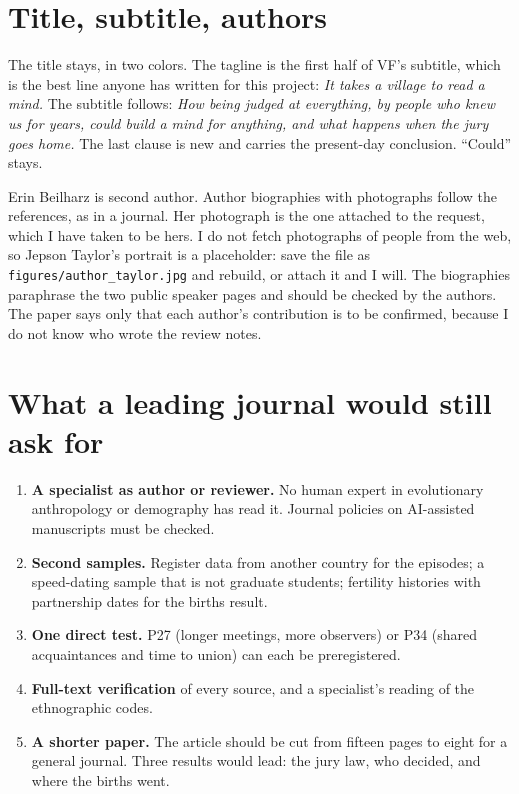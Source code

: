 \documentclass[10pt,letterpaper]{extarticle}
\newcommand{\lab}[1]{\textbf{#1}}
\begin{document}
\section{Title, subtitle, authors}

The title stays, in two colors. The tagline is the first half of VF's subtitle, which is the best line anyone has written
for this project: \emph{It takes a village to read a mind.} The subtitle follows: \emph{How being judged at everything, by
people who knew us for years, could build a mind for anything, and what happens when the jury goes home.} The last clause
is new and carries the present-day conclusion. ``Could'' stays.

Erin Beilharz is second author. Author biographies with photographs follow the references, as in a journal. Her
photograph is the one attached to the request, which I have taken to be hers. I do not fetch photographs of people from
the web, so Jepson Taylor's portrait is a placeholder: save the file as \texttt{figures/author\_taylor.jpg} and rebuild, or
attach it and I will. The biographies paraphrase the two public speaker pages and should be checked by the authors. The
paper says only that each author's contribution is to be confirmed, because I do not know who wrote the review notes.

\section{What a leading journal would still ask for}

\begin{enumerate}
\item \lab{A specialist as author or reviewer.} No human expert in evolutionary anthropology or demography has read it.
Journal policies on AI-assisted manuscripts must be checked.
\item \lab{Second samples.} Register data from another country for the episodes; a speed-dating sample that is not graduate
students; fertility histories with partnership dates for the births result.
\item \lab{One direct test.} P27 (longer meetings, more observers) or P34 (shared acquaintances and time to union) can each
be preregistered.
\item \lab{Full-text verification} of every source, and a specialist's reading of the ethnographic codes.
\item \lab{A shorter paper.} The article should be cut from fifteen pages to eight for a general journal. Three results
would lead: the jury law, who decided, and where the births went.
\end{enumerate}
\end{document}
